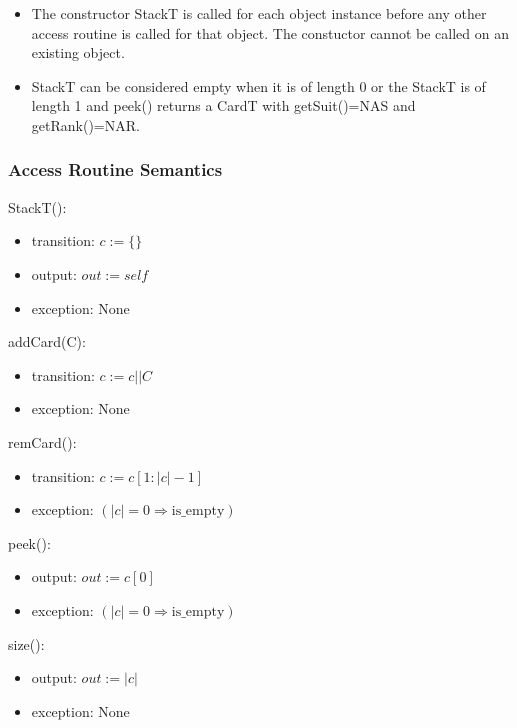 \documentclass[12pt]{article}
\newcommand{\means}{\Rightarrow}
\newcommand{\m}[1]{\mbox{#1}}
\begin{document}
\begin{itemize}
    \item The constructor StackT is called for each object instance
    before any other access routine is called for that object. The
    constuctor cannot be called on an existing object.
    \item StackT can be considered empty when it is of length 0 or the
    StackT is of length 1 and peek() returns a CardT with getSuit()=\m{NAS}
    and getRank()=\m{NAR}.
\end{itemize}

\subsubsection* {Access Routine Semantics}

StackT():
\begin{itemize}
    \item transition: $c := \{\}$
    \item output: $out := \mathit{self}$
    \item exception: None
\end{itemize}

\noindent addCard(C):
\begin{itemize}
    \item transition: $c := c||C$
    \item exception: None
\end{itemize}

\noindent remCard():
\begin{itemize}
    \item transition: $c := c[1:|c|-1]$
    \item exception: $(|c|=0 \means \m{is\_empty})$
\end{itemize}

\noindent peek():
\begin{itemize}
    \item output: $out := c[0]$
    \item exception: $(|c|=0 \means \m{is\_empty})$
\end{itemize}

\noindent size():
\begin{itemize}
    \item output: $out := |c|$
    \item exception: None
\end{itemize}

\newpage
\end{document}
